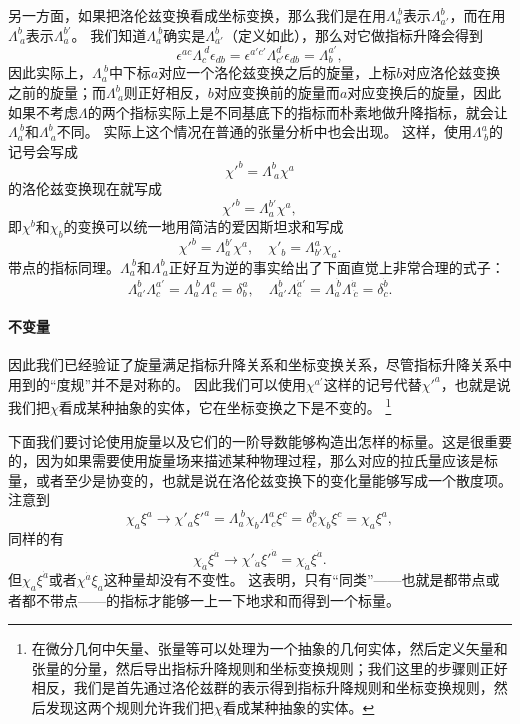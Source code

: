 另一方面，如果把洛伦兹变换看成坐标变换，那么我们是在用$\Lambda_a^{\ b}$表示$\Lambda_{a'}^b$，而在用$\Lambda^b_{\ a}$表示$\Lambda_a^{b'}$。
我们知道$\Lambda_a^{\ b}$确实是$\Lambda_{a'}^{b}$（定义如此），那么对它做指标升降会得到
\[
    \epsilon^{ac} \Lambda_c^{\ d} \epsilon_{db} = \epsilon^{a' c'} \Lambda_{c'}^{d} \epsilon_{db} = \Lambda^{a'}_b,
\]
因此实际上，$\Lambda_a^{\ b}$中下标$a$对应一个洛伦兹变换之后的旋量，上标$b$对应洛伦兹变换之前的旋量；而$\Lambda_{\ a}^b$则正好相反，$b$对应变换前的旋量而$a$对应变换后的旋量，因此如果不考虑$\Lambda$的两个指标实际上是不同基底下的指标而朴素地做升降指标，就会让$\Lambda_a^{\ b}$和$\Lambda^b_{\ a}$不同。
实际上这个情况在普通的张量分析中也会出现。
这样，使用$\Lambda^a_{\ b}$的记号会写成
\[
    \chi'^b = \Lambda^b_{\ a} \chi^a
\]
的洛伦兹变换现在就写成
\[
    \chi'^b = \Lambda_a^{b'} \chi^a,
\]
即$\chi^b$和$\chi_b$的变换可以统一地用简洁的爱因斯坦求和写成
\[
    \chi'^b = \Lambda_a^{b'} \chi^a, \quad \chi'_b = \Lambda_{b'}^a \chi_a.
\]
带点的指标同理。$\Lambda_a^{\ b}$和$\Lambda^b_{\ a}$正好互为逆的事实给出了下面直觉上非常合理的式子：
\begin{equation}
    \Lambda_{a'}^b \Lambda^{a'}_c = \Lambda_a^{\ b} \Lambda^a_{\ c} = \delta_b^a, \quad \Lambda_{\dot{a}'}^{\dot{b}} \Lambda^{\dot{a}'}_{\dot{c}} = \Lambda_{\dot{a}}^{\ \dot{b}} \Lambda^{\dot{a}}_{\ \dot{c}} = \delta_{\dot{c}}^{\dot{b}}.
\end{equation}

\paragraph{不变量} 因此我们已经验证了旋量满足指标升降关系和坐标变换关系，尽管指标升降关系中用到的“度规”并不是对称的。
因此我们可以使用$\chi^{a'}$这样的记号代替${\chi'}^{a}$，也就是说我们把$\chi$看成某种抽象的实体，它在坐标变换之下是不变的。%
\footnote{在微分几何中矢量、张量等可以处理为一个抽象的几何实体，然后定义矢量和张量的分量，然后导出指标升降规则和坐标变换规则；我们这里的步骤则正好相反，我们是首先通过洛伦兹群的表示得到指标升降规则和坐标变换规则，然后发现这两个规则允许我们把$\chi$看成某种抽象的实体。}%

下面我们要讨论使用旋量以及它们的一阶导数能够构造出怎样的标量。这是很重要的，因为如果需要使用旋量场来描述某种物理过程，那么对应的拉氏量应该是标量，或者至少是协变的，也就是说在洛伦兹变换下的变化量能够写成一个散度项。
注意到
\[
    \chi_a \xi^a \longrightarrow \chi'_a {\xi'}^a = \Lambda_a^{\ b} \chi_b \Lambda^a_{\ c} \xi^c = \delta_c^b \chi_b \xi^c = \chi_a \xi^a,
\]
同样的有
\[
    \chi_{\dot{a}} \xi^{\dot{a}} \longrightarrow \chi'_{\dot{a}} {\xi'}^{\dot{a}} = \chi_{\dot{a}} \xi^{\dot{a}}.
\]
但$\chi_a \xi^{\dot{a}}$或者$\chi^{\dot{a}} \xi_a$这种量却没有不变性。
这表明，只有“同类”——也就是都带点或者都不带点——的指标才能够一上一下地求和而得到一个标量。

